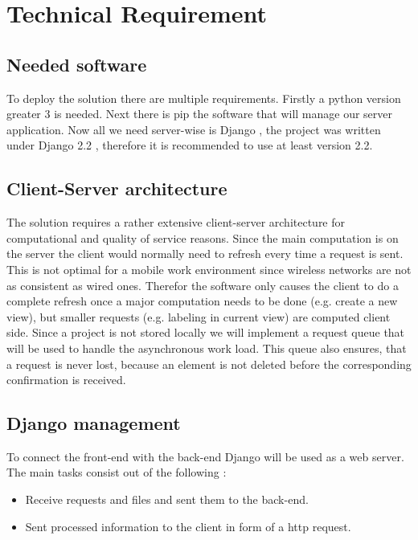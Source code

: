 \documentclass[12pt]{extarticle}
\begin{document}
\section{Technical Requirement}

\subsection{Needed software}
To deploy the solution there are multiple requirements. Firstly a python version greater 3 is needed. Next there is pip the software that will manage our server application. Now all we need server-wise is Django , the project was written under Django 2.2 , therefore it is recommended to use at least version 2.2.

\subsection{Client-Server architecture}
The solution requires a rather extensive client-server architecture for computational and quality of service reasons. Since the main computation is on the server the client would normally need to refresh every time a request is sent. This is not optimal for a mobile work environment since wireless networks are not as consistent as wired ones. Therefor the software only causes the client to do a complete refresh once a major computation needs to be done (e.g. create a new view), but smaller requests (e.g. labeling in current view) are computed client side. Since a project is not stored locally we will implement a request queue that will be used to handle the asynchronous work load. This queue also ensures, that a request is never lost, because an element is not deleted before the corresponding confirmation is received. 

\subsection{Django management}
To connect the front-end with the back-end Django will be used as a web server. The main tasks consist out of the following :
\begin{itemize}
	\item Receive requests and files and sent them to the back-end.
	\item Sent processed information to the client in form of a http request.
\end{itemize}

\printbibliography
\end{document}
